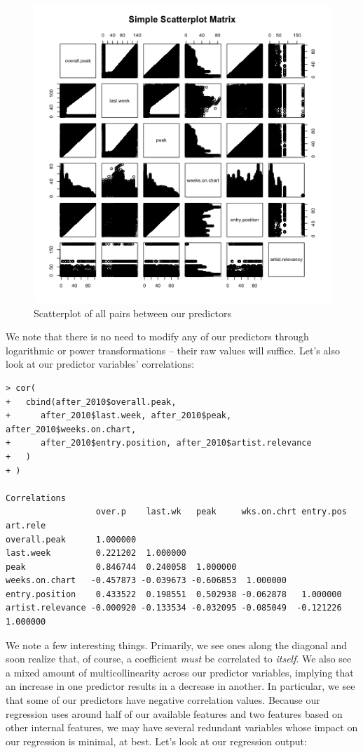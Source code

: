 \documentclass[11pt]{article} %
\begin{document}
\begin{figure}[H]
	\label{Figure 2}
	\caption{Scatterplot of all pairs between our predictors}
	\includegraphics[scale = 0.5]{plots/pairs}
	\centering
\end{figure}

We note that there is no need to modify any of our predictors through logarithmic or power transformations -- their raw values will suffice. Let's also look at our predictor variables' correlations:

\begin{verbatim}
> cor(
+   cbind(after_2010$overall.peak, 
+      after_2010$last.week, after_2010$peak, after_2010$weeks.on.chart,
+      after_2010$entry.position, after_2010$artist.relevance
+   )
+ )

Correlations
                  over.p    last.wk   peak     wks.on.chrt entry.pos art.rele
overall.peak      1.000000
last.week         0.221202  1.000000   
peak              0.846744  0.240058  1.000000
weeks.on.chart   -0.457873 -0.039673 -0.606853  1.000000
entry.position    0.433522  0.198551  0.502938 -0.062878   1.000000
artist.relevance -0.000920 -0.133534 -0.032095 -0.085049  -0.121226  1.000000
\end{verbatim}

We note a few interesting things. Primarily, we see ones along the diagonal and soon realize that, of course, a coefficient \textit{must} be correlated to \textit{itself}. We also see a mixed amount of multicollinearity across our predictor variables, implying that an increase in one predictor results in a decrease in another. In particular, we see that some of our predictors have negative correlation values. Because our regression uses around half of our available features and two features based on other internal features, we may have several redundant variables whose impact on our regression is minimal, at best. Let's look at our regression output:
\end{document}
